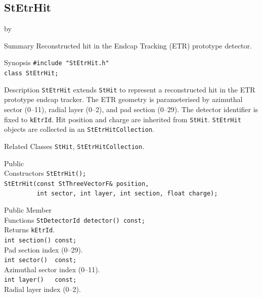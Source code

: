 \documentclass[twoside]{article}
\newcommand{\entrylabel}[1]{\mbox{\textbf{{#1}}}\hfil}%
\newenvironment{entry}
{\begin{list}{}%
    {\renewcommand{\makelabel}{\entrylabel}%
     \setlength{\labelwidth}{90pt}%
     \setlength{\leftmargin}{\labelwidth}
     \advance\leftmargin by \labelsep%
      }%
    }%
  {\end{list}}
\newcommand{\Entrylabel}[1]%
{\raisebox{0pt}[1ex][0pt]{\makebox[\labelwidth][l]%
    {\parbox[t]{\labelwidth}{\hspace{0pt}\textbf{{#1}}}}}}
\newenvironment{Entry}%
{\renewcommand{\entrylabel}{\Entrylabel}\begin{entry}}%
  {\end{entry}}
\begin{document}
\subsection{StEtrHit}
\label{sec:StEtrHit}
\begin{Entry}
\item[Summary]
    Reconstructed hit in the Endcap Tracking (ETR) prototype detector.

\item[Synopsis]
    \verb+#include "StEtrHit.h"+\\
    \verb+class StEtrHit;+\\

\item[Description]
    \texttt{StEtrHit} extends \texttt{StHit} to represent a reconstructed
    hit in the ETR prototype endcap tracker.  The ETR geometry is parameterised
    by azimuthal sector (0--11), radial layer (0--2), and pad section (0--29).
    The detector identifier is fixed to \texttt{kEtrId}.  Hit position and
    charge are inherited from \texttt{StHit}.  \texttt{StEtrHit} objects are
    collected in an \texttt{StEtrHitCollection}.

\item[Related Classes]
    \texttt{StHit}, \texttt{StEtrHitCollection}.

\item[Public\\ Constructors]
    \verb+StEtrHit();+\\
    \verb+StEtrHit(const StThreeVectorF& position,+\\
    \verb+         int sector, int layer, int section, float charge);+\\

\item[Public Member\\ Functions]
    \verb+StDetectorId detector() const;+\\
        Returns \texttt{kEtrId}.\\
    \verb+int section() const;+\\
        Pad section index (0--29).\\
    \verb+int sector()  const;+\\
        Azimuthal sector index (0--11).\\
    \verb+int layer()   const;+\\
        Radial layer index (0--2).\\
\end{Entry}
\clearpage
\end{document}
